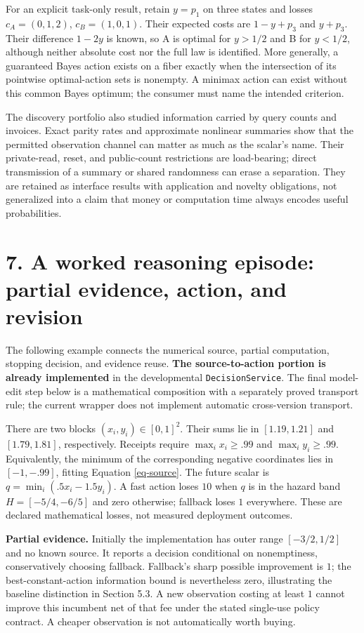 \documentclass{article}
\theoremstyle{definition}
\begin{document}
For an explicit task-only result, retain \(y=p_1\) on three states and
losses \(c_A=(0,1,2)\), \(c_B=(1,0,1)\). Their expected costs are
\(1-y+p_3\) and \(y+p_3\). Their difference \(1-2y\) is known, so A is
optimal for \(y>1/2\) and B for \(y<1/2\), although neither absolute
cost nor the full law is identified. More generally, a guaranteed Bayes
action exists on a fiber exactly when the intersection of its pointwise
optimal-action sets is nonempty. A minimax action can exist without this
common Bayes optimum; the consumer must name the intended criterion.

The discovery portfolio also studied information carried by query counts
and invoices. Exact parity rates and approximate nonlinear summaries
show that the permitted observation channel can matter as much as the
scalar's name. Their private-read, reset, and public-count restrictions
are load-bearing; direct transmission of a summary or shared randomness
can erase a separation. They are retained as interface results with
application and novelty obligations, not generalized into a claim that
money or computation time always encodes useful probabilities.

\section{7. A worked reasoning episode: partial evidence, action, and
revision}\label{sec-episode}

The following example connects the numerical source, partial
computation, stopping decision, and evidence reuse. \textbf{The
source-to-action portion is already implemented} in the developmental
\texttt{DecisionService}. The final model-edit step below is a
mathematical composition with a separately proved transport rule; the
current wrapper does not implement automatic cross-version transport.

There are two blocks \((x_i,y_i)\in[0,1]^2\). Their sums lie in
\([1.19,1.21]\) and \([1.79,1.81]\), respectively. Receipts require
\(\max_i x_i\geq.99\) and \(\max_i y_i\geq.99\). Equivalently, the
minimum of the corresponding negative coordinates lies in \([-1,-.99]\),
fitting Equation \ref{eq-source}. The future scalar is
\(q=\min_i(.5x_i-1.5y_i)\). A fast action loses \(10\) when \(q\) is in
the hazard band \(H=[-5/4,-6/5]\) and zero otherwise; fallback loses
\(1\) everywhere. These are declared mathematical losses, not measured
deployment outcomes.

\textbf{Partial evidence.} Initially the implementation has outer range
\([-3/2,1/2]\) and no known source. It reports a decision conditional on
nonemptiness, conservatively choosing fallback. Fallback's sharp
possible improvement is \(1\); the best-constant-action information
bound is nevertheless zero, illustrating the baseline distinction in
Section 5.3. A new observation costing at least \(1\) cannot improve
this incumbent net of that fee under the stated single-use policy
contract. A cheaper observation is not automatically worth buying.
\end{document}
